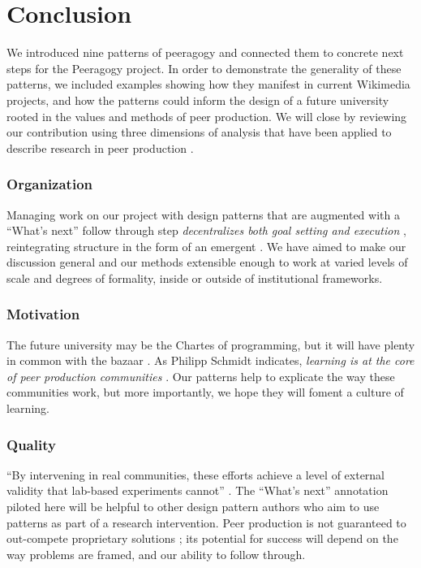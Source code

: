 \section{Conclusion}\label{sec:Conclusion}

We introduced nine patterns of peeragogy and connected them to
concrete next steps for the Peeragogy project.  In order to
demonstrate the generality of these patterns, we included examples
showing how they manifest in current Wikimedia projects, and 
how the patterns could inform the design of a future university rooted in the
values and methods of peer production.
%
We will close by reviewing our contribution using
three dimensions of analysis that have been applied to describe
research in peer production \cite{benkler2015peer}.

\vspace{-.25\baselineskip}

\subsubsection*{Organization} 
Managing work on our project with design patterns that are augmented with
a ``What's next'' follow through step \emph{decentralizes both goal setting
  and execution} \cite{benkler2015peer}, reintegrating structure in
the form of an emergent .  We have aimed to make
our discussion general and our methods extensible enough to work at
varied levels of scale and degrees of formality, inside or outside of
institutional frameworks.

\vspace{-.25\baselineskip}

\subsubsection*{Motivation}  The future university may be
the Chartes of programming, but it will have plenty in common with the
bazaar \cite{raymond2001cathedral}.  As Philipp Schmidt
indicates, \emph{learning is at the core of peer production
  communities} \cite{schmidt+commons-based+2009}.  Our patterns help
to explicate the way these communities work, but more importantly,
we hope they will foment a culture of learning.

\vspace{-.25\baselineskip}

\subsubsection*{Quality} 
``By intervening in real communities, these efforts achieve a level of
external validity that lab-based experiments cannot''
\cite{benkler2015peer}.  The ``What's next'' annotation piloted here
will be helpful to other design pattern authors who aim to use
patterns as part of a research intervention.  Peer production is not guaranteed to
  out-compete proprietary solutions
\cite{benkler2015peer,free-software-better}; its potential for
success will depend on the way problems are framed,
and our ability to follow through.

